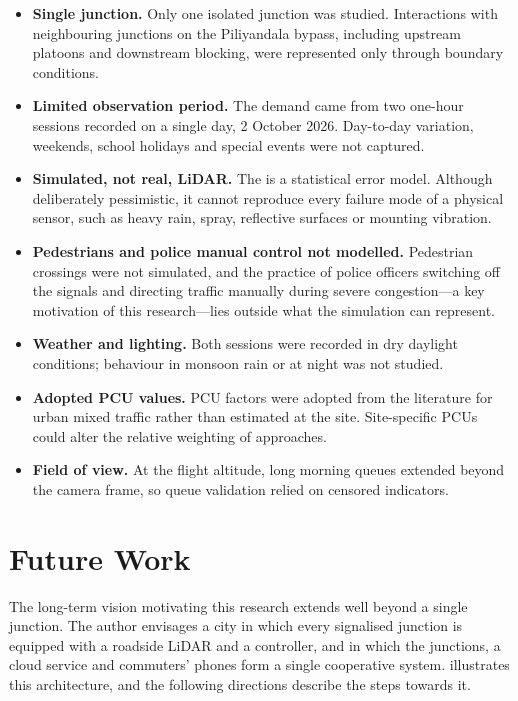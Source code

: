 \begin{itemize}[leftmargin=*]
  \item \textbf{Single junction.} Only one isolated junction was studied. Interactions with neighbouring junctions on the Piliyandala bypass, including upstream platoons and downstream blocking, were represented only through boundary conditions.
  \item \textbf{Limited observation period.} The demand came from two one-hour sessions recorded on a single day, 2 October 2026. Day-to-day variation, weekends, school holidays and special events were not captured.
  \item \textbf{Simulated, not real, LiDAR.} The \vls{} is a statistical error model. Although deliberately pessimistic, it cannot reproduce every failure mode of a physical sensor, such as heavy rain, spray, reflective surfaces or mounting vibration.
  \item \textbf{Pedestrians and police manual control not modelled.} Pedestrian crossings were not simulated, and the practice of police officers switching off the signals and directing traffic manually during severe congestion---a key motivation of this research---lies outside what the simulation can represent.
  \item \textbf{Weather and lighting.} Both sessions were recorded in dry daylight conditions; behaviour in monsoon rain or at night was not studied.
  \item \textbf{Adopted PCU values.} PCU factors were adopted from the literature for urban mixed traffic rather than estimated at the site. Site-specific PCUs could alter the relative weighting of approaches.
  \item \textbf{Field of view.} At the flight altitude, long morning queues extended beyond the camera frame, so queue validation relied on censored indicators.
\end{itemize}

\section{Future Work}\label{sec:futurework}

The long-term vision motivating this research extends well beyond a single junction. The author envisages a city in which every signalised junction is equipped with a roadside LiDAR and a \prism{} controller, and in which the junctions, a cloud service and commuters' phones form a single cooperative system.  illustrates this architecture, and the following directions describe the steps towards it.

